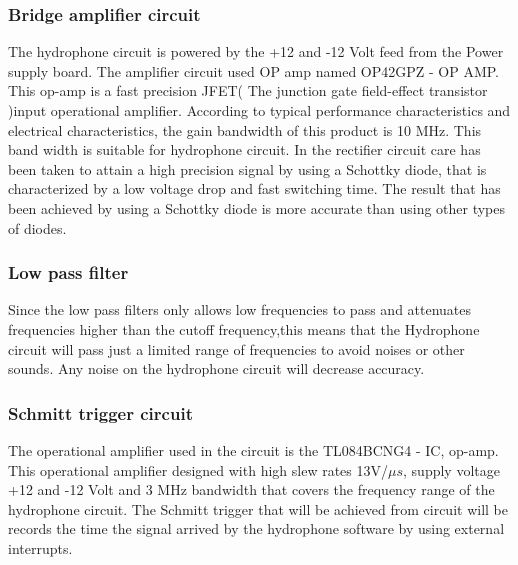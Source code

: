 \subsubsection{Bridge amplifier circuit }
The hydrophone circuit is powered by the +12 and -12 Volt feed from the Power supply board. The amplifier circuit used OP amp named OP42GPZ - OP AMP. This op-amp is a fast precision JFET( The junction gate field-effect transistor )input operational amplifier.\newline
According to typical performance characteristics and electrical characteristics, the gain bandwidth of this product is 10 MHz. This band width is suitable for hydrophone circuit.\newline
In the rectifier circuit care has been taken to attain a high precision signal by using a Schottky diode, that is characterized by a low voltage drop and fast switching time.
The result that has been achieved by using a Schottky diode is more accurate than using other types of diodes.  

\subsubsection{Low pass filter}
Since the low pass filters only allows low frequencies to pass and attenuates frequencies higher than the cutoff frequency,this means that the Hydrophone circuit will pass just a limited range of frequencies to avoid noises or other sounds. Any noise on the hydrophone circuit will decrease accuracy.    
 
 \subsubsection{Schmitt trigger  circuit}
The operational amplifier used in the circuit is the \newline TL084BCNG4 - IC, op-amp. This operational amplifier designed with high slew rates 13V/$\mu s$, supply voltage +12 and -12 Volt and 3 MHz bandwidth that covers the frequency range of the hydrophone circuit.
The Schmitt trigger that will be achieved from circuit will be records the time the signal arrived by the hydrophone software by using external interrupts.
 

